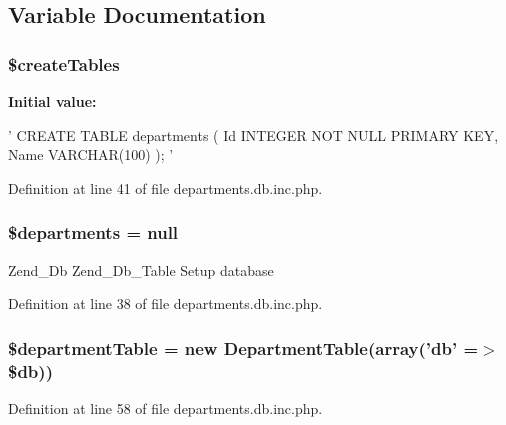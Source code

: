 \subsection{\-Variable \-Documentation}
\hypertarget{departments_8db_8inc_8php_a357d57bd32f1b2ca29a9674741f44fd3}{
\subsubsection[{\$create\-Tables}]{\setlength{\rightskip}{0pt plus 5cm}\$create\-Tables}}\label{departments_8db_8inc_8php_a357d57bd32f1b2ca29a9674741f44fd3}
{\bfseries \-Initial value\-:}
\begin{DoxyCode}
 '
        CREATE TABLE departments (
                Id                      INTEGER NOT NULL PRIMARY KEY,
                Name                    VARCHAR(100)
        );
'
\end{DoxyCode}


\-Definition at line 41 of file departments.\-db.\-inc.\-php.

\hypertarget{departments_8db_8inc_8php_ae2ea4305886b612a4ca8efa178aaec9c}{
\subsubsection[{\$departments}]{\setlength{\rightskip}{0pt plus 5cm}\$departments = null}}\label{departments_8db_8inc_8php_ae2ea4305886b612a4ca8efa178aaec9c}
\-Zend\-\_\-\-Db \-Zend\-\_\-\-Db\-\_\-\-Table \-Setup database 

\-Definition at line 38 of file departments.\-db.\-inc.\-php.

\hypertarget{departments_8db_8inc_8php_a5f957d1183dd8067ec2cde9eaedb50de}{
\subsubsection[{\$department\-Table}]{\setlength{\rightskip}{0pt plus 5cm}\$department\-Table = new {\bf \-Department\-Table}(array('db' =$>$ \$db))}}\label{departments_8db_8inc_8php_a5f957d1183dd8067ec2cde9eaedb50de}


\-Definition at line 58 of file departments.\-db.\-inc.\-php.

